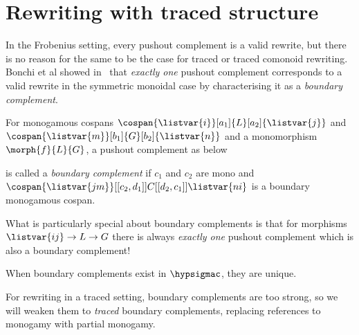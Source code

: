 \section{Rewriting with traced structure}

In the Frobenius setting, every pushout complement is a valid rewrite, but there
is no reason for the same to be the case for traced or traced comonoid
rewriting.
Bonchi et al showed in~\cite{bonchi2022stringa} that \emph{exactly one} pushout
complement corresponds to a valid rewrite in the symmetric monoidal case by
characterising it as a \emph{boundary complement}.

\begin{definition}
    For monogamous cospans \(
    \cospan{\listvar{i}}[a_1]{L}[a_2]{\listvar{j}}
    \) and \(
    \cospan{\listvar{m}}[b_1]{G}[b_2]{\listvar{n}}
    \) and a monomorphism \(\morph{f}{L}{G}\), a pushout complement as below
    \begin{center}
    \end{center}
    is called a \emph{boundary complement} if \(c_1\) and \(c_2\) are
    mono and \(
    \cospan{\listvar{jm}}[[c_2,d_1]]{C}[[d_2,c_1]]{\listvar{ni}}
    \) is a boundary monogamous cospan.
\end{definition}

What is particularly special about boundary complements is that for morphisms
\(\listvar{ij} \to L \to G\) there is always \emph{exactly one} pushout
complement which is also a boundary complement!

\begin{proposition}
    When boundary complements exist in \(\hypsigmac\), they are unique.
\end{proposition}

For rewriting in a traced setting, boundary complements are too strong, so we
will weaken them to \emph{traced} boundary complements, replacing references to
monogamy with partial monogamy.


